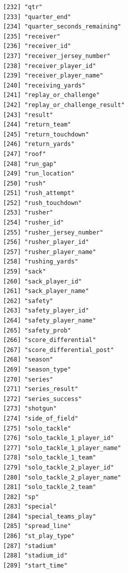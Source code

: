\documentclass[
  letterpaper,
]{krantz}
\begin{document}
\begin{verbatim}
[232] "qtr"                                 
[233] "quarter_end"                         
[234] "quarter_seconds_remaining"           
[235] "receiver"                            
[236] "receiver_id"                         
[237] "receiver_jersey_number"              
[238] "receiver_player_id"                  
[239] "receiver_player_name"                
[240] "receiving_yards"                     
[241] "replay_or_challenge"                 
[242] "replay_or_challenge_result"          
[243] "result"                              
[244] "return_team"                         
[245] "return_touchdown"                    
[246] "return_yards"                        
[247] "roof"                                
[248] "run_gap"                             
[249] "run_location"                        
[250] "rush"                                
[251] "rush_attempt"                        
[252] "rush_touchdown"                      
[253] "rusher"                              
[254] "rusher_id"                           
[255] "rusher_jersey_number"                
[256] "rusher_player_id"                    
[257] "rusher_player_name"                  
[258] "rushing_yards"                       
[259] "sack"                                
[260] "sack_player_id"                      
[261] "sack_player_name"                    
[262] "safety"                              
[263] "safety_player_id"                    
[264] "safety_player_name"                  
[265] "safety_prob"                         
[266] "score_differential"                  
[267] "score_differential_post"             
[268] "season"                              
[269] "season_type"                         
[270] "series"                              
[271] "series_result"                       
[272] "series_success"                      
[273] "shotgun"                             
[274] "side_of_field"                       
[275] "solo_tackle"                         
[276] "solo_tackle_1_player_id"             
[277] "solo_tackle_1_player_name"           
[278] "solo_tackle_1_team"                  
[279] "solo_tackle_2_player_id"             
[280] "solo_tackle_2_player_name"           
[281] "solo_tackle_2_team"                  
[282] "sp"                                  
[283] "special"                             
[284] "special_teams_play"                  
[285] "spread_line"                         
[286] "st_play_type"                        
[287] "stadium"                             
[288] "stadium_id"                          
[289] "start_time"                          

\end{verbatim}
\end{document}
